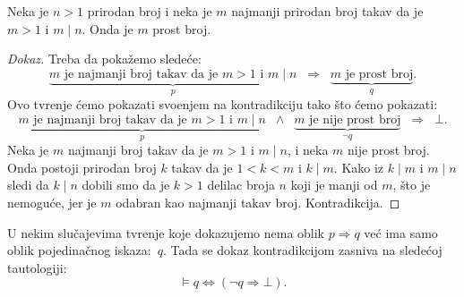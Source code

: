 \begin{EX}\label{ft05.ex.min-prime}
  Neka je $n > 1$ prirodan broj i neka je $m$ najmanji prirodan broj takav da je $m > 1$ i $m \mid n$. Onda je $m$ prost broj.
\end{EX}
\begin{proof}[Dokaz]
  Treba da poka\v zemo slede\'ce:
  $$
    \underbrace{m \text{\ \ je najmanji broj takav da je } m > 1 \text{ i } m \mid n}_p
    \;\;\Rightarrow\;\;
    \underbrace{m \text{\ \ je prost broj}}_q.
  $$
  Ovo tvr\dj enje \'cemo pokazati svo\dj enjem na kontradikciju tako \v sto \'cemo pokazati:
  $$
    \underbrace{m \text{\ \ je najmanji broj takav da je } m > 1 \text{ i } m \mid n}_p \;\;\land\;\;
    \underbrace{m \text{\ \ je nije prost broj}}_{\lnot q}
    \;\;\Rightarrow\;\; \bot.
  $$
  Neka je $m$ najmanji broj takav da je $m > 1$ i $m \mid n$, i neka $m$ nije prost broj.
  Onda postoji prirodan broj $k$ takav da je $1 < k < m$ i $k \mid m$.
  Kako iz $k \mid m$ i $m \mid n$ sledi da $k \mid n$ dobili smo da je $k > 1$ delilac broja $n$ koji je manji od $m$,
  \v sto je nemogu\'ce, jer je $m$ odabran kao najmanji takav broj. Kontradikcija.
\end{proof}

U nekim slu\v cajevima tvr\dj enje koje dokazujemo nema oblik $p \Rightarrow q$ ve\'c ima samo oblik pojedina\v cnog iskaza:~$q$.
Tada se dokaz kontradikcijom zasniva na slede\'coj tautologiji:
$$
  \vDash q \Leftrightarrow (\lnot q \Rightarrow \bot).
$$

